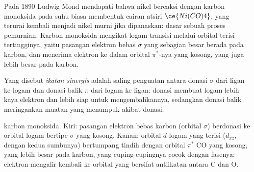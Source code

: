 Pada 1890 Ludwig Mond mendapati bahwa nikel bereaksi dengan karbon monoksida
pada suhu biasa membentuk cairan atsiri $\ce{Ni(CO)4}$, yang terurai kembali menjadi nikel
murni jika dipanaskan: dasar sebuah proses pemurnian. Karbon monoksida mengikat
logam transisi melalui orbital terisi tertingginya, yaitu pasangan elektron bebas $\sigma$ yang sebagian besar
berada pada karbon, dan menerima elektron ke dalam orbital $\pi^*$-nya yang kosong, yang juga lebih besar pada
karbon.

\begin{definition}\label{def:b3:organometallic-bonding:synergic}
Yang disebut \emph{ikatan sinergis} adalah saling penguatan antara
donasi $\sigma$ dari ligan ke logam dan donasi balik $\pi$ dari logam ke
ligan: donasi membuat logam lebih kaya elektron dan lebih siap untuk
mengembalikannya, sedangkan donasi balik meringankan muatan yang menumpuk akibat donasi.
\end{definition}

\begin{omfigure}

{\small {} karbon monoksida. Kiri: pasangan elektron bebas karbon (orbital $\sigma$)
berdonasi ke orbital logam bertipe $\sigma$ yang kosong. Kanan: orbital $d$ logam yang terisi
($d_{xz}$, dengan kedua sumbunya) bertumpang tindih dengan orbital $\pi^*$ CO yang kosong, yang lebih besar pada
karbon, yang cuping-cupingnya cocok dengan fasenya: elektron mengalir kembali ke orbital yang
bersifat antiikatan antara C dan O.}
\end{omfigure}

